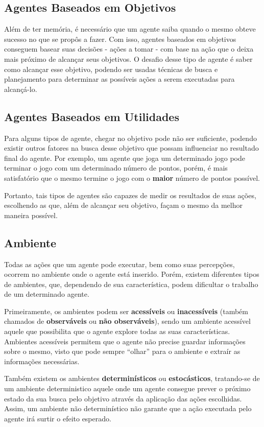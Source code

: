 \subsection{Agentes Baseados em Objetivos}
Além de ter memória, é necessário que um agente saiba quando o mesmo obteve
sucesso no que se propôs a fazer. Com isso, agentes baseados em objetivos
conseguem basear suas decisões - ações a tomar - com base na ação que o deixa
mais próximo de alcançar seus objetivos. O desafio desse tipo de agente é saber
como alcançar esse objetivo, podendo ser usadas técnicas de busca e planejamento
para determinar as possíveis ações a serem executadas para alcançá-lo.

\subsection{Agentes Baseados em Utilidades}
Para alguns tipos de agente, chegar no objetivo pode não ser suficiente, podendo
existir outros fatores na busca desse objetivo que possam influenciar no
resultado final do agente. Por exemplo, um agente que joga um determinado jogo
pode terminar o jogo com um determinado número de pontos, porém, é mais
satisfatório que o mesmo termine o jogo com o \textbf{maior} número de pontos
possível.

Portanto, tais tipos de agentes são capazes de medir os resultados de suas
ações, escolhendo as que, além de alcançar seu objetivo, façam o mesmo da melhor
maneira possível.

\subsection{Ambiente}
Todas as ações que um agente pode executar, bem como suas percepções, ocorrem no
ambiente onde o agente está inserido. Porém, existem diferentes tipos de
ambientes, que, dependendo de sua característica, podem dificultar o trabalho de
um determinado agente.

Primeiramente, os ambientes podem ser \textbf{acessíveis} ou
\textbf{inacessíveis} (também chamados de \textbf{observáveis} ou \textbf{não
observáveis}), sendo um ambiente acessível aquele que possibilita que o agente
explore todas as suas características. Ambientes acessíveis permitem que o
agente não precise guardar informações sobre o mesmo, visto que pode sempre
``olhar'' para o ambiente e extraír as informações necessárias.

Também existem os ambientes \textbf{determinísticos} ou \textbf{estocásticos},
tratando-se de um ambiente deterministico aquele onde um agente consegue prever
o próximo estado da sua busca pelo objetivo através da aplicação das ações
escolhidas. Assim, um ambiente não determinístico não garante que a ação
executada pelo agente irá surtir o efeito esperado.

